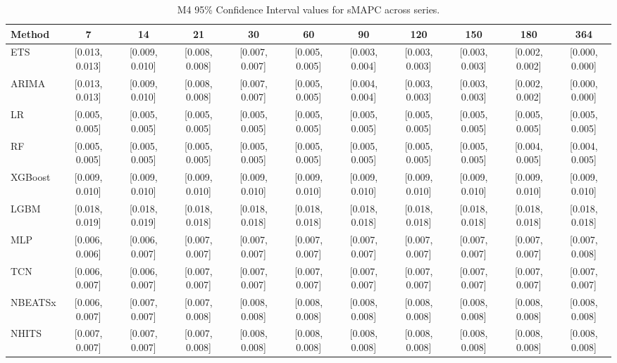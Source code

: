 \begin{table}[!ht]
\centering
\begin{adjustbox}{max width=\textwidth}
\begin{tabular}{lcccccccccc}
\toprule
Method & 7 & 14 & 21 & 30 & 60 & 90 & 120 & 150 & 180 & 364 \\
\midrule
ETS & [0.013, 0.013] & [0.009, 0.010] & [0.008, 0.008] & [0.007, 0.007] & [0.005, 0.005] & [0.003, 0.004] & [0.003, 0.003] & [0.003, 0.003] & [0.002, 0.002] & [0.000, 0.000] \\
ARIMA & [0.013, 0.013] & [0.009, 0.010] & [0.008, 0.008] & [0.007, 0.007] & [0.005, 0.005] & [0.004, 0.004] & [0.003, 0.003] & [0.003, 0.003] & [0.002, 0.002] & [0.000, 0.000] \\
LR & [0.005, 0.005] & [0.005, 0.005] & [0.005, 0.005] & [0.005, 0.005] & [0.005, 0.005] & [0.005, 0.005] & [0.005, 0.005] & [0.005, 0.005] & [0.005, 0.005] & [0.005, 0.005] \\
RF & [0.005, 0.005] & [0.005, 0.005] & [0.005, 0.005] & [0.005, 0.005] & [0.005, 0.005] & [0.005, 0.005] & [0.005, 0.005] & [0.005, 0.005] & [0.004, 0.005] & [0.004, 0.005] \\
XGBoost & [0.009, 0.010] & [0.009, 0.010] & [0.009, 0.010] & [0.009, 0.010] & [0.009, 0.010] & [0.009, 0.010] & [0.009, 0.010] & [0.009, 0.010] & [0.009, 0.010] & [0.009, 0.010] \\
LGBM & [0.018, 0.019] & [0.018, 0.019] & [0.018, 0.018] & [0.018, 0.018] & [0.018, 0.018] & [0.018, 0.018] & [0.018, 0.018] & [0.018, 0.018] & [0.018, 0.018] & [0.018, 0.018] \\
MLP & [0.006, 0.006] & [0.006, 0.007] & [0.007, 0.007] & [0.007, 0.007] & [0.007, 0.007] & [0.007, 0.007] & [0.007, 0.007] & [0.007, 0.007] & [0.007, 0.007] & [0.007, 0.008] \\
TCN & [0.006, 0.007] & [0.006, 0.007] & [0.007, 0.007] & [0.007, 0.007] & [0.007, 0.007] & [0.007, 0.007] & [0.007, 0.007] & [0.007, 0.007] & [0.007, 0.007] & [0.007, 0.007] \\
NBEATSx & [0.006, 0.007] & [0.007, 0.007] & [0.007, 0.008] & [0.008, 0.008] & [0.008, 0.008] & [0.008, 0.008] & [0.008, 0.008] & [0.008, 0.008] & [0.008, 0.008] & [0.008, 0.008] \\
NHITS & [0.007, 0.007] & [0.007, 0.007] & [0.007, 0.008] & [0.008, 0.008] & [0.008, 0.008] & [0.008, 0.008] & [0.008, 0.008] & [0.008, 0.008] & [0.008, 0.008] & [0.008, 0.008] \\
\bottomrule
\end{tabular}
\end{adjustbox}
\caption{M4 95\% Confidence Interval values for sMAPC across series.}
\label{tab:ci_m4_smapc}
\end{table}

